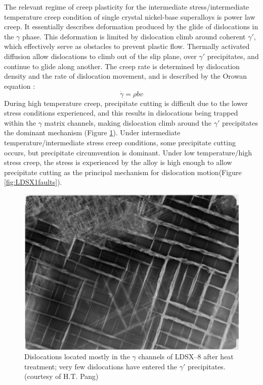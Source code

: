 The relevant regime of creep plasticity for the intermediate stress/intermediate temperature creep condition of single crystal nickel-base superalloys is power law creep.  It essentially describes deformation produced by the glide of dislocations in the $\gamma$ phase.  This deformation is limited by dislocation climb around coherent $\gamma'$, which effectively serve as obstacles to prevent plastic flow.  Thermally activated diffusion allow dislocations to climb out of the slip plane, over $\gamma'$ precipitates, and continue to glide along another.  The creep rate is determined by dislocation density and the rate of dislocation movement, and is described by the Orowan equation \cite{nabarro95}:
%
\begin{equation}
\dot{\gamma}  = \rho  b  v  
\end{equation}
%
During high temperature creep, precipitate cutting is difficult due to the lower stress conditions experienced, and this results in dislocations being trapped within the $\gamma$ matrix channels, making dislocation climb around the $\gamma'$ precipitates the dominant mechanism (Figure \ref{fig:LDSX8disloc}). Under intermediate temperature/intermediate stress creep conditions, some precipitate cutting occurs, but precipitate circumvention is dominant. Under low temperature/high stress creep, the stress is experienced by the alloy is high enough to allow precipitate cutting as the principal mechanism for dislocation motion(Figure \ref{fig:LDSX1faults}).
%
\vspace{1cm}
\begin{figure}[H]
\begin{center}
\includegraphics{LDSX8disloc}
\caption{Dislocations located mostly in the $\gamma$ channels of LDSX--8 after heat treatment; very few dislocations have entered the $\gamma'$ precipitates. (courtesy of H.T. Pang)}\label{fig:LDSX8disloc}
\end{center}
\end{figure}
%

